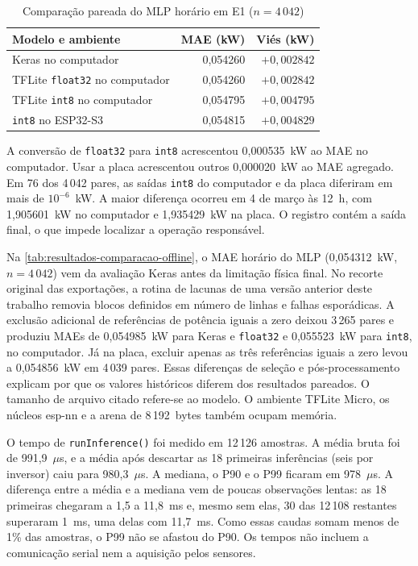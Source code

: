 \begin{table}[htbp]
    \centering
    \small
    \caption{Comparação pareada do MLP horário em E1 ($n=4\,042$)}
    \label{tab:pareamento-e1}
    \begin{tabular}{lrr}
        \toprule
        Modelo e ambiente & MAE (kW) & Viés (kW) \\
        \midrule
        Keras no computador & 0,054260 & $+0,002842$ \\
        TFLite \texttt{float32} no computador & 0,054260 & $+0,002842$ \\
        TFLite \texttt{int8} no computador & 0,054795 & $+0,004795$ \\
        \texttt{int8} no ESP32-S3 & 0,054815 & $+0,004829$ \\
        \bottomrule
    \end{tabular}
\end{table}

A conversão de \texttt{float32} para \texttt{int8} acrescentou 0,000535~kW
ao MAE no computador. Usar a placa acrescentou outros 0,000020~kW ao MAE
agregado. Em 76 dos 4\,042 pares, as saídas \texttt{int8} do computador e da
placa diferiram em mais de $10^{-6}$~kW. A maior diferença ocorreu em 4 de
março às 12~h, com 1,905601~kW no computador e 1,935429~kW na placa. O
registro contém a saída final, o que impede localizar a operação
responsável.

Na \cref{tab:resultados-comparacao-offline}, o MAE horário do MLP
(0,054312~kW, $n=4\,042$) vem da avaliação Keras antes da limitação física
final. No recorte original das exportações, a rotina de lacunas de uma versão
anterior deste trabalho removia blocos definidos em número de linhas e falhas
esporádicas. A exclusão adicional de referências de potência iguais a zero
deixou 3\,265 pares e produziu MAEs de 0,054985~kW para Keras e
\texttt{float32} e 0,055523~kW para \texttt{int8}, no computador. Já na
placa, excluir apenas as três referências iguais a zero levou a
0,054856~kW em 4\,039 pares. Essas diferenças de seleção e pós-processamento
explicam por que os valores históricos diferem dos resultados pareados. O tamanho de arquivo citado refere-se ao modelo. O
ambiente TFLite Micro, os núcleos esp-nn e a arena de 8\,192~bytes também
ocupam memória.

O tempo de \texttt{runInference()} foi medido em 12\,126 amostras. A média
bruta foi de 991,9~$\mu$s, e a média após descartar as 18 primeiras
inferências (seis por inversor) caiu para 980,3~$\mu$s. A mediana, o P90 e o
P99 ficaram em 978~$\mu$s. A diferença entre a média e a mediana vem de
poucas observações lentas: as 18 primeiras chegaram a 1,5 a 11,8~ms e, mesmo
sem elas, 30 das 12\,108 restantes superaram 1~ms, uma delas com 11,7~ms.
Como essas caudas somam menos de 1\% das amostras, o P99 não se afastou do
P90. Os tempos não incluem a comunicação serial nem a aquisição pelos
sensores.

